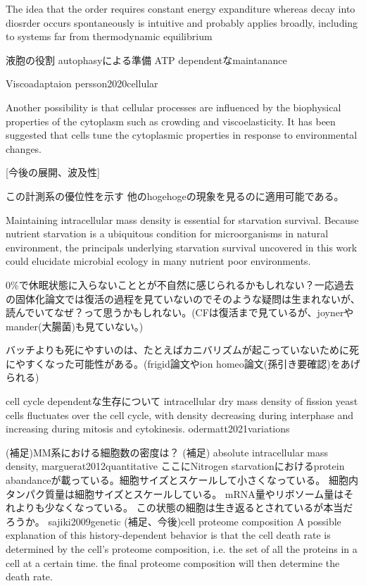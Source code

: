  The idea that the order requires constant energy expanditure whereas decay into diosrder occurs spontaneously is intuitive and probably applies broadly, including to systems far from thermodynamic equilibrium

液胞の役割
autophasyによる準備
ATP dependentなmaintanance

Viscoadaptaion
persson2020cellular

Another possibility is that cellular processes are influenced by the biophysical properties of the cytoplasm such as crowding and viscoelasticity. It has been suggested that cells tune the cytoplasmic properties in response to environmental changes.

[今後の展開、波及性]

この計測系の優位性を示す
他のhogehogeの現象を見るのに適用可能である。

Maintaining intracellular mass density is essential for starvation survival. 
Because nutrient starvation is a ubiquitous condition for microorganisms in natural environment, the principals underlying starvation survival uncovered in this work could elucidate microbial ecology in many nutrient poor environments. 

0\%で休眠状態に入らないこととが不自然に感じられるかもしれない？一応過去の固体化論文では復活の過程を見ていないのでそのような疑問は生まれないが、読んでいてなぜ？って思うかもしれない。(CFは復活まで見ているが、joynerやmander(大腸菌)も見ていない。)

バッチよりも死にやすいのは、たとえばカニバリズムが起こっていないために死にやすくなった可能性がある。(frigid論文やion homeo論文(孫引き要確認)をあげられる)

cell cycle dependentな生存について
intracellular dry mass density of fission yeast cells fluctuates over the cell cycle, with density decreasing during interphase and increasing during mitosis and cytokinesis. odermatt2021variations


(補足)MM系における細胞数の密度は？
(補足)
absolute intracellular mass density, marguerat2012quantitative
ここにNitrogen starvationにおけるprotein abandanceが載っている。細胞サイズとスケールして小さくなっている。
細胞内タンパク質量は細胞サイズとスケールしている。
mRNA量やリボソーム量はそれよりも少なくなっている。
この状態の細胞は生き返るとされているが本当だろうか。
sajiki2009genetic
(補足、今後)cell proteome composition
A possible explanation of this history-dependent behavior is that the cell death rate is determined by the cell’s proteome composition, i.e. the set of all the proteins in a cell at a certain time.
the final proteome composition will then determine the death rate.


